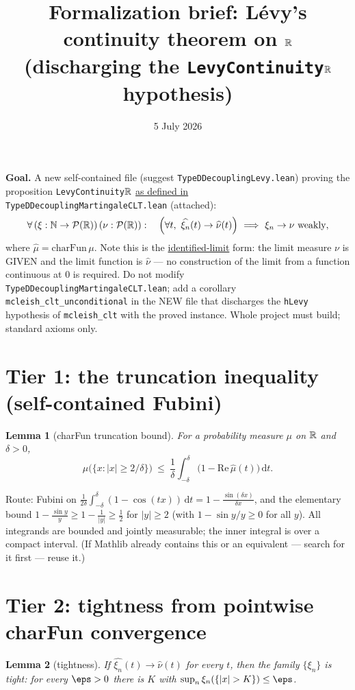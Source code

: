 \documentclass[11pt]{article}
\title{Formalization brief: L\'evy's continuity theorem on $\mathbb{R}$\\
(discharging the \texttt{LevyContinuity$\mathbb{R}$} hypothesis)}
\date{5 July 2026}
\theoremstyle{plain}
\newtheorem{lemma}{Lemma}
\theoremstyle{remark}
\newcommand{\dd}{\,\mathrm d}
\begin{document}
\maketitle

\noindent\textbf{Goal.} A new self-contained file (suggest
\texttt{TypeDDecouplingLevy.lean}) proving the proposition
\texttt{LevyContinuity}$\mathbb{R}$ \underline{as defined in}
\texttt{TypeDDecouplingMartingaleCLT.lean} (attached):
\[
  \forall\,(\xi:\mathbb N\to\mathcal P(\mathbb{R}))\,(\nu:\mathcal P(\mathbb{R})):\quad
  \Big(\forall t,\ \widehat{\xi_n}(t)\to\widehat\nu(t)\Big)
  \ \Longrightarrow\ \xi_n\to\nu\ \text{weakly},
\]
where $\widehat\mu=\mathrm{charFun}\,\mu$. Note this is the \underline{identified-limit}
form: the limit measure $\nu$ is GIVEN and the limit function is $\widehat\nu$ ---
no construction of the limit from a function continuous at $0$ is required.
Do not modify \texttt{TypeDDecouplingMartingaleCLT.lean}; add a corollary
\texttt{mcleish\_clt\_unconditional} in the NEW file that discharges the
\texttt{hLevy} hypothesis of \texttt{mcleish\_clt} with the proved instance.
Whole project must build; standard axioms only.

\section*{Tier 1: the truncation inequality (self-contained Fubini)}

\begin{lemma}[charFun truncation bound]\label{lem:trunc}
For a probability measure $\mu$ on $\mathbb{R}$ and $\delta>0$,
\[
  \mu\big(\{x:|x|\ge 2/\delta\}\big)\ \le\
  \frac1\delta\int_{-\delta}^{\delta}
  \big(1-\mathrm{Re}\,\widehat\mu(t)\big)\dd t .
\]
\end{lemma}

\noindent Route: Fubini on
$\frac1{2\delta}\int_{-\delta}^\delta(1-\cos(tx))\dd t
=1-\frac{\sin(\delta x)}{\delta x}$, and the elementary bound
$1-\frac{\sin y}{y}\ge1-\frac1{|y|}\ge\frac12$ for $|y|\ge2$ (with
$1-\sin y/y\ge0$ for all $y$). All integrands are bounded and jointly
measurable; the inner integral is over a compact interval. (If Mathlib
already contains this or an equivalent --- search for it first --- reuse it.)

\section*{Tier 2: tightness from pointwise charFun convergence}

\begin{lemma}[tightness]\label{lem:tight}
If $\widehat{\xi_n}(t)\to\widehat\nu(t)$ for every $t$, then the family
$\{\xi_n\}$ is tight: for every $\eps>0$ there is $K$ with
$\sup_n\xi_n(\{|x|>K\})\le\eps$.
\end{lemma}
\end{document}
